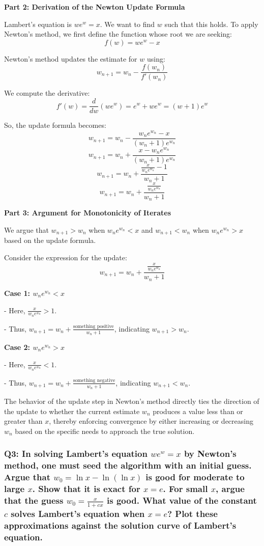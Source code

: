 \documentclass[8pt]{article}
\begin{document}
\textbf{Part 2: Derivation of the Newton Update Formula}

Lambert's equation is \(we^w = x\). We want to find \(w\) such that this holds. To apply Newton's method, we first define the function whose root we are seeking:
\[ f(w) = we^w - x \]

Newton's method updates the estimate for \(w\) using:
\[ w_{n+1} = w_n - \frac{f(w_n)}{f'(w_n)} \]

We compute the derivative:
\[ f'(w) = \frac{d}{dw}(we^w) = e^w + we^w = (w + 1)e^w \]

So, the update formula becomes:
\[ w_{n+1} = w_n - \frac{w_n e^{w_n} - x}{(w_n + 1)e^{w_n}} \]
\[ w_{n+1} = w_n + \frac{x - w_n e^{w_n}}{(w_n + 1)e^{w_n}} \]
\[ w_{n+1} = w_n + \frac{\frac{x}{w_n e^{w_n}} - 1}{w_n + 1} \]
\[ w_{n+1} = w_n + \frac{\frac{x}{w_n e^{w_n}}}{w_n + 1} \]

\textbf{Part 3: Argument for Monotonicity of Iterates}

We argue that \(w_{n+1} > w_n\) when \(w_n e^{w_n} < x\) and \(w_{n+1} < w_n\) when \(w_n e^{w_n} > x\) based on the update formula.

Consider the expression for the update:
\[ w_{n+1} = w_n + \frac{\frac{x}{w_n e^{w_n}}}{w_n + 1} \]

\textbf{Case 1: \(w_n e^{w_n} < x\)}

- Here, \(\frac{x}{w_n e^{w_n}} > 1\).

- Thus, \(w_{n+1} = w_n + \frac{\text{something positive}}{w_n + 1}\), indicating \(w_{n+1} > w_n\).

\textbf{Case 2: \(w_n e^{w_n} > x\)}

- Here, \(\frac{x}{w_n e^{w_n}} < 1\).

- Thus, \(w_{n+1} = w_n + \frac{\text{something negative}}{w_n + 1}\), indicating \(w_{n+1} < w_n\).

The behavior of the update step in Newton’s method directly ties the direction of the update to whether the current estimate \(w_n\) produces a value less than or greater than \(x\), thereby enforcing convergence by either increasing or decreasing \(w_n\) based on the specific needs to approach the true solution.

\subsubsection*{Q3: In solving Lambert’s equation \(we^w = x\) by Newton’s method, one must seed the algorithm with an initial guess. Argue that \(w_0 = \ln x - \ln(\ln x)\) is good for moderate to large \(x\). Show that it is exact for \(x = e\). For small \(x\), argue that the guess \(w_0 = \frac{x}{1 + cx}\) is good. What value of the constant \(c\) solves Lambert’s equation when \(x = e\)? Plot these approximations against the solution curve of Lambert’s equation.}
\end{document}
